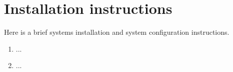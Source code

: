 

\nocite{*}




\appendix
\section{Installation instructions} \label{App:instructions}


Here is a brief systems installation and system configuration instructions. 

\begin{enumerate}

\item ...
\item ...

\end{enumerate}

